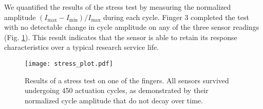 We quantified the results of the stress test by measuring the normalized amplitude $(I_\textrm{max}-I_\textrm{min})/I_\textrm{max}$ during each cycle. Finger 3 completed the test with no detectable change in cycle amplitude on any of the three sensor readings (Fig. \ref{fig:stress}). This result indicates that the sensor is able to retain its response characteristics over a typical research service life. 
\begin{figure}
\centering
\texttt{[image: stress\_plot.pdf]}
\caption{Results of a stress test on one of the fingers. All sensors survived undergoing 450 actuation cycles, as demonstrated by their normalized cycle amplitude that do not decay over time.}
\label{fig:stress}
\vspace{-1em}
\end{figure}